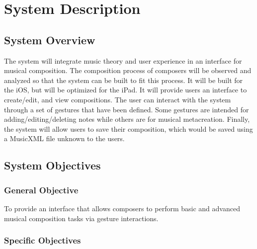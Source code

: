 \section{System Description}

\subsection{System Overview}

The system will integrate music theory and user experience in an interface for musical composition. The composition process of composers will be observed and analyzed so that the system can be built to fit this process. It will be built for the iOS, but will be optimized for the iPad. It will provide users an interface to create/edit, and view compositions. The user can interact with the system through a set of gestures that have been defined. Some gestures are intended for adding/editing/deleting notes while others are for musical metacreation. Finally, the system will allow users to save their composition, which would be saved using a MusicXML file unknown to the users.

\subsection{System Objectives}

	\subsubsection{General Objective}
		
        To provide an interface that allows composers to perform basic and advanced musical composition tasks via gesture interactions.

	\subsubsection{Specific Objectives}
    
